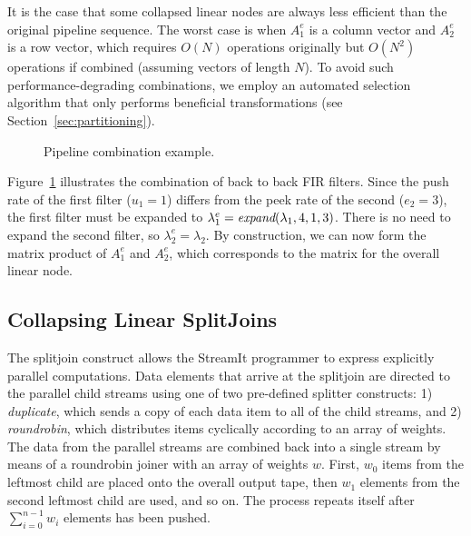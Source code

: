 \documentclass{sig-alternate}
\begin{document}
{It is the case that some collapsed linear nodes are always
less efficient than the original pipeline sequence.  The worst case is
when $A_1^e$ is a column vector and $A_2^e$ is a row vector, which
requires $O(N)$ operations originally but $O(N^2)$ operations if
combined (assuming vectors of length $N$).  To avoid such
performance-degrading combinations, we employ an automated selection
algorithm that only performs beneficial transformations (see
Section~\ref{sec:partitioning}).

\begin{figure}[t]
\begin{center}
\vspace{-6pt}
\caption{Pipeline combination example.}
\label{fig:example-pipeline-combination}
\end{center}
\vspace{-22pt}
\makeline
\vspace{-14pt}
\end{figure}

Figure~\ref{fig:example-pipeline-combination} illustrates the
combination of back to back FIR filters. Since the push rate of the
first filter ($u_1=1$) differs from the peek rate of the second
($e_2=3$), the first filter must be expanded to $\lambda_1^e =
\mbox{\it expand}(\lambda_1,4,1,3)$.  There is no need to expand the second
filter, so $\lambda_2^e = \lambda_2$. By construction, we can now form
the matrix product of $A_1^e$ and $A_2^e$, which corresponds to the
matrix for the overall linear node.

\subsection{Collapsing Linear SplitJoins}

The splitjoin construct allows the StreamIt programmer to
express explicitly parallel computations.  Data elements that arrive
at the splitjoin are directed to the parallel child streams
using one of two pre-defined splitter constructs: 1) {\it duplicate},
which sends a copy of each data item to all of the child streams, and
2) {\it roundrobin}, which distributes items cyclically according to an
array of weights.  The data from the parallel streams are
combined back into a single stream by means of a roundrobin 
joiner with an array of weights $w$.  First, $w_0$ items from the
leftmost child are placed onto the overall output
tape, then $w_1$ elements from the second leftmost child are used,
and so on.  The process repeats itself after
$\sum_{i=0}^{n-1} w_i$ elements has been pushed.

}
\end{document}
